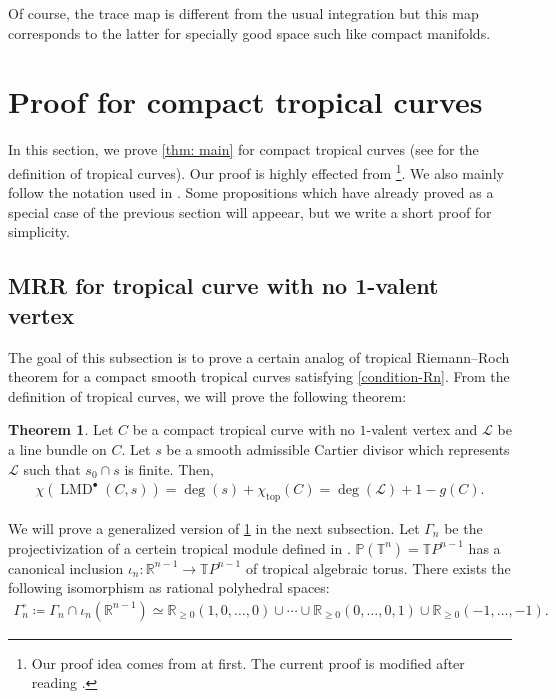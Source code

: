 \documentclass[a4paper,dvipdfmx,reqno,12pt]{amsart}
\theoremstyle{definition}
\newtheorem{theorem}{Theorem}[section]
\newcommand{\deq}{\coloneqq}
\newcommand{\opn}[1]{\operatorname{#1}}
\numberwithin{equation}{section}
\begin{document}
Of course, the trace map is different from the usual integration 
but this map corresponds to the latter 
for specially good space such like compact manifolds.

\section{Proof for compact tropical curves}
In this section, we prove \cref{thm: main} for 
compact tropical curves
(see \cite[Definition 3.1]{mikhalkinTropicalCurvesTheir2008a} 
for the definition of tropical curves).
Our proof is highly effected from 
\cite{knill2012graph,MR2676658,auroux2022lagrangian}
\footnote{Our proof idea comes from 
\cite{knill2012graph,MR2676658} at first.  
The current proof is modified after reading 
\cite{auroux2022lagrangian}.}.
We also mainly follow the notation used in 
\cite{auroux2022lagrangian}.
Some propositions which have already proved as a special case
of the previous section will appeear, but we write a short proof 
for simplicity.

\subsection{MRR for tropical curve with no 1-valent
vertex}

The goal of this subsection is to prove a certain 
analog of tropical Riemann--Roch theorem for
a compact smooth tropical 
curves satisfying \cref{condition-Rn}. 
From the definition of tropical curves, we will prove
the following theorem:
\begin{theorem}
\label{theorem-MRR-metric-graph}
Let $C$ be a compact tropical curve with 
no $1$-valent vertex and 
$\mathcal{L}$ be a line bundle on $C$.
Let $s$ be a smooth admissible Cartier divisor which
represents $\mathcal{L}$ such that 
$s_0\cap s$ is finite. Then,
\begin{align}
  \chi(\opn{LMD}^{\bullet}(C,s))=\opn{deg}(s)+
\chi_{\opn{top}}(C)=\opn{deg}(\mathcal{L})+1-g(C).
\end{align}
\end{theorem}
We will prove a generalized version of 
\cref{theorem-MRR-metric-graph} in the next subsection.
Let $\Gamma_{n}$ be the projectivization of 
a certein tropical module defined in 
\cite[2.2]{mikhalkinTropicalCurvesTheir2008a}.
$\mathbb{P}(\mathbb{T}^{n})=\mathbb{T}P^{n-1}$ has a canonical inclusion
$\iota_n\colon \mathbb{R}^{n-1}\to 
\mathbb{T}P^{n-1}$ 
of tropical algebraic torus.
There exists the following isomorphism as rational 
polyhedral spaces:
\begin{align}
\Gamma_{n}^{\circ}\deq \Gamma_{n}\cap \iota_n(\mathbb{R}^{n-1}) \simeq \mathbb{R}_{\geq 0}(1,0,\ldots,0)\cup \cdots
\cup {\mathbb{R}}_{\geq 0}(0,\ldots,0,1)\cup 
{\mathbb{R}}_{\geq 0}(-1,\ldots,-1).
\end{align}
\end{document}

